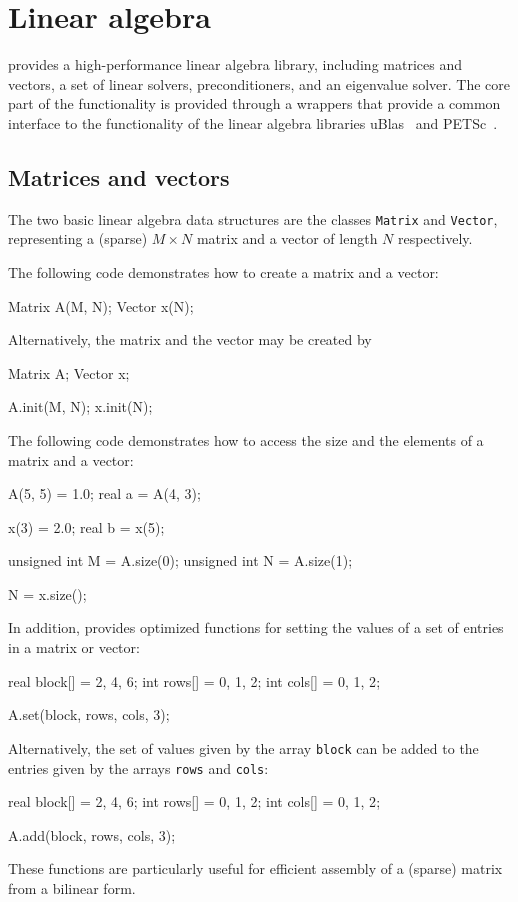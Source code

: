 \chapter{Linear algebra}


\dolfin{} provides a high-performance linear algebra library,
including matrices and vectors, a set of linear solvers,
preconditioners, and an eigenvalue solver. The core part of the
functionality is provided through a wrappers that provide a common
interface to the functionality of the linear algebra libraries
uBlas~\cite{www:ublas} and PETSc~\cite{www:petsc}.

\section{Matrices and vectors}

The two basic linear algebra data structures are the classes
\texttt{Matrix} and \texttt{Vector}, representing a (sparse) $M\times
N$ matrix and a vector of length $N$ respectively.

The following code demonstrates how to create a matrix and a vector:
\begin{code}
Matrix A(M, N);
Vector x(N);
\end{code}
Alternatively, the matrix and the vector may be created by
\begin{code}
Matrix A;
Vector x;

A.init(M, N);
x.init(N);
\end{code}

The following code demonstrates how to access the size and the
elements of a matrix and a vector:
\begin{code}
A(5, 5) = 1.0;
real a = A(4, 3);

x(3) = 2.0;
real b = x(5);

unsigned int M = A.size(0);
unsigned int N = A.size(1);

N = x.size();
\end{code}

In addition, \dolfin{} provides optimized functions for setting the
values of a set of entries in a matrix or vector:
\begin{code}
real block[] = {2, 4, 6};
int rows[] = {0, 1, 2};
int cols[] = {0, 1, 2};
  
A.set(block, rows, cols, 3);
\end{code}
Alternatively, the set of values given by the array \texttt{block} can
be added to the entries given by the arrays \texttt{rows} and
\texttt{cols}:
\begin{code}
real block[] = {2, 4, 6};
int rows[] = {0, 1, 2};
int cols[] = {0, 1, 2};
  
A.add(block, rows, cols, 3);
\end{code}
These functions are particularly useful for efficient assembly of a (sparse)
matrix from a bilinear form.

